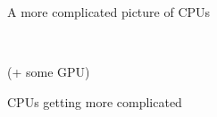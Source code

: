 \documentclass[sans,mathserif]{beamer}
\begin{document}
\begin{frame}
  \begin{center}
    \LARGE A more complicated picture of CPUs

~

(+ some GPU)
  \end{center}
\end{frame}

\begin{frame}{CPUs getting more complicated}
  \begin{center}
  \end{center}
  
\end{frame}
\end{document}
